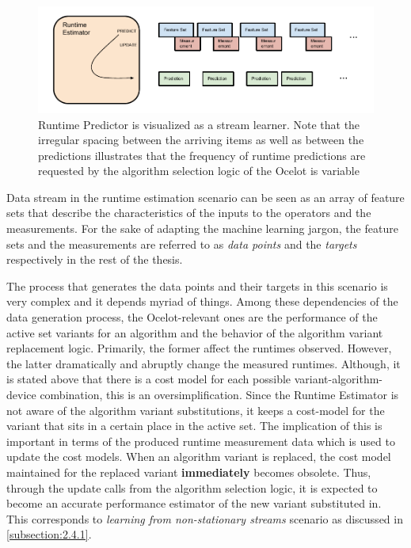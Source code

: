 \begin{figure}[htbp]
  \centering
    \includegraphics[width=\linewidth]{./Figures/Ocelot2.pdf}
  \caption{Runtime Predictor is visualized as a stream learner. Note that the irregular spacing between the arriving items as well as between the predictions illustrates that the frequency of runtime predictions are requested by the algorithm selection logic of the Ocelot is variable}
  \label{fig:Ocelot2}
\end{figure}

Data stream in the runtime estimation scenario can be seen as an array of feature sets that describe the characteristics of the inputs to the operators and the measurements. For the sake of adapting the machine learning jargon, the feature sets and the measurements are referred to as \textit{data points} and the \textit{targets} respectively in the rest of the thesis. 

The process that generates the data points and their targets in this scenario is very complex and it depends myriad of things. Among these dependencies of the data generation process, the Ocelot-relevant ones are the performance of the active set variants for an algorithm and the behavior of the algorithm variant replacement logic. Primarily, the former affect the runtimes observed. However, the latter dramatically and abruptly change the measured runtimes. Although, it is stated above that there is a cost model for each possible variant-algorithm-device combination, this is an oversimplification. Since the Runtime Estimator is not aware of the algorithm variant substitutions, it keeps a cost-model for the variant that sits in a certain place in the active set. The implication of this is important in terms of the produced runtime measurement data which is used to update the cost models. When an algorithm variant is replaced, the cost model maintained for the replaced variant \textbf{immediately} becomes obsolete. Thus, through the update calls from the algorithm selection logic, it is expected to become an accurate performance estimator of the new variant substituted in. This corresponds to \textit{learning from non-stationary streams} scenario as discussed in \ref{subsection:2.4.1}. 

